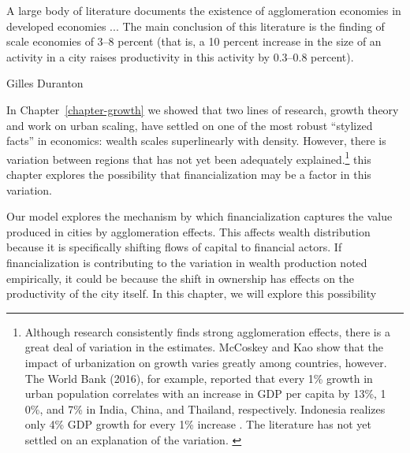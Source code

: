 \epigraph{A large body of literature documents the existence of agglomeration economies in developed economies ... The main conclusion of this literature is the finding of scale economies of 3--8 percent (that is, a 10 percent increase in the size of an activity in a city raises productivity in this activity by 0.3--0.8 percent).}{Gilles Duranton \cite{durantonAreCitiesEngines2009}} %


{\color{black} In Chapter~\ref{chapter-growth} we showed that two lines of research, growth theory and work on urban scaling, have settled on one of the most robust ``stylized facts'' in economics: wealth scales superlinearly with density. However, there is variation between regions that has not yet been adequately explained.\footnote{Although research consistently finds strong agglomeration effects, there is a great deal of variation in the estimates. McCoskey and Kao \cite{mccoskeyPanelDataInvestigation} show that the impact of urbanization on growth varies greatly among countries, however. The World Bank (2016), for example, reported that every 1\% growth in urban population correlates with an increase in GDP per capita by 13\%, 1
0\%, and 7\% in India, China, and Thailand, respectively. Indonesia realizes only 4\% GDP growth for every 1\% increase \cite{haryantotriRelationshipUrbanizationEducation2021}.  The literature has not yet settled on an explanation of the variation.  \cite{loboUrbanScalingProduction2013, pugaMagnitudeCausesAgglomeration2010} } this chapter explores the possibility that financialization may be a factor in this variation. 

Our model explores the mechanism by which financialization captures the value produced in cities by agglomeration effects. This affects wealth distribution because it is specifically shifting flows of capital to financial actors. If financialization is contributing to the variation in wealth production noted empirically, it could be because the shift in ownership has effects on the productivity of the city itself. In this chapter, we will explore this possibility}



